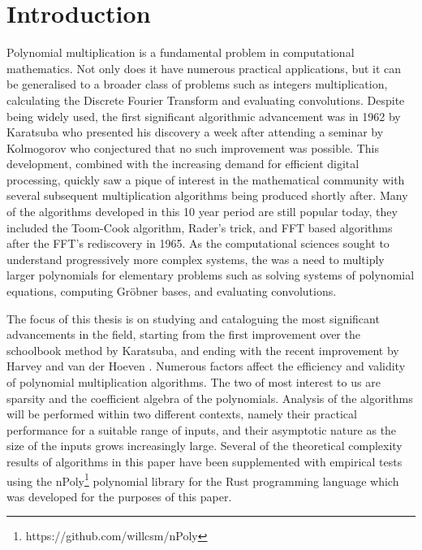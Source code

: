 \chapter{Introduction}\label{introduction}


Polynomial multiplication is a fundamental problem in computational mathematics. Not only does it have numerous practical applications, but it can be generalised to a broader class of problems such as integers multiplication, calculating the Discrete Fourier Transform and evaluating convolutions. Despite being widely used, the first significant algorithmic advancement was in 1962 by Karatsuba \cite{karatsuba} who presented his discovery a week after attending a seminar by Kolmogorov who conjectured that no such improvement was possible. This development, combined with the increasing demand for efficient digital processing, quickly saw a pique of interest in the mathematical community with several subsequent multiplication algorithms being produced shortly after. Many of the algorithms developed in this 10 year period are still popular today, they included the Toom-Cook algorithm, Rader's trick, and FFT based algorithms after the FFT's rediscovery in 1965. As the computational sciences sought to understand progressively more complex systems, the was a need to multiply larger polynomials for elementary problems such as solving systems of polynomial equations, computing Gr\"{o}bner bases, and evaluating convolutions. 


\medskip

The focus of this thesis is on studying and cataloguing the most significant advancements in the field, starting from the first improvement over the schoolbook method by Karatsuba, and ending with the recent improvement by Harvey and van der Hoeven \cite{nlogn}. Numerous factors affect the efficiency and validity of polynomial multiplication algorithms. The two of most interest to us are sparsity and the coefficient algebra of the polynomials. Analysis of the algorithms will be performed within two different contexts, namely their practical performance for a suitable range of inputs, and their asymptotic nature as the size of the inputs grows increasingly large. Several of the theoretical complexity results of algorithms in this paper have been supplemented with empirical tests using the nPoly\footnote{https://github.com/willcsm/nPoly} polynomial library for the Rust programming language which was developed for the purposes of this paper.

